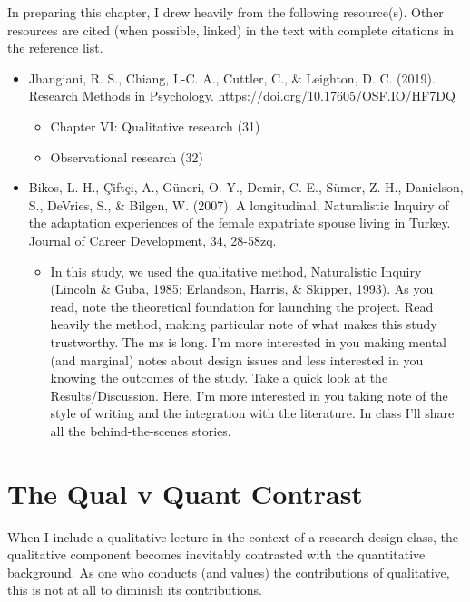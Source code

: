 \documentclass[
  english,
]{book}
\providecommand{\tightlist}{%
  \setlength{\itemsep}{0pt}\setlength{\parskip}{0pt}}
\begin{document}
In preparing this chapter, I drew heavily from the following resource(s). Other resources are cited (when possible, linked) in the text with complete citations in the reference list.

\begin{itemize}
\tightlist
\item
  Jhangiani, R. S., Chiang, I.-C. A., Cuttler, C., \& Leighton, D. C. (2019). Research Methods in Psychology. \url{https://doi.org/10.17605/OSF.IO/HF7DQ}

  \begin{itemize}
  \tightlist
  \item
    Chapter VI: Qualitative research (31)
  \item
    Observational research (32)
  \end{itemize}
\item
  Bikos, L. H., Çiftçi, A., Güneri, O. Y., Demir, C. E., Sümer, Z. H., Danielson, S., DeVries, S., \& Bilgen, W. (2007). A longitudinal, Naturalistic Inquiry of the adaptation experiences of the female expatriate spouse living in Turkey. Journal of Career Development, 34, 28-58zq.

  \begin{itemize}
  \tightlist
  \item
    In this study, we used the qualitative method, Naturalistic Inquiry (Lincoln \& Guba, 1985; Erlandson, Harris, \& Skipper, 1993). As you read, note the theoretical foundation for launching the project. Read heavily the method, making particular note of what makes this study trustworthy. The ms is long. I'm more interested in you making mental (and marginal) notes about design issues and less interested in you knowing the outcomes of the study. Take a quick look at the Results/Discussion. Here, I'm more interested in you taking note of the style of writing and the integration with the literature. In class I'll share all the behind-the-scenes stories.
  \end{itemize}
\end{itemize}

\hypertarget{the-qual-v-quant-contrast}{%
\section{The Qual v Quant Contrast}\label{the-qual-v-quant-contrast}}

When I include a qualitative lecture in the context of a research design class, the qualitative component becomes inevitably contrasted with the quantitative background. As one who conducts (and values) the contributions of qualitative, this is not at all to diminish its contributions.
\end{document}
